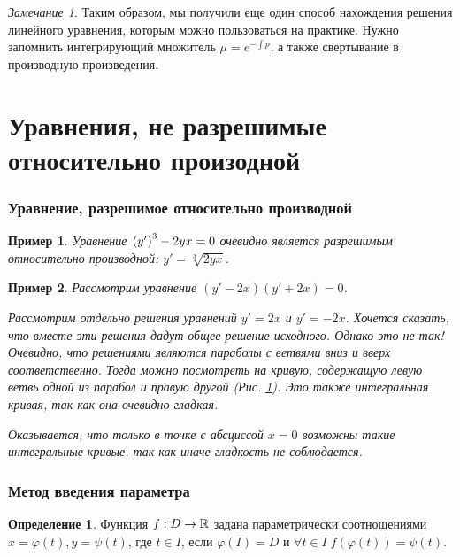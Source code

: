 \documentclass[a5paper, 10pt]{article}
\theoremstyle{definition}
\newtheorem{Def}{Определение}
\theoremstyle{plain}
\newtheorem{Ex}{Пример}
\theoremstyle{remark}
\newtheorem*{Note}{Замечание}
\begin{document}
	\begin{Note}
		Таким образом, мы получили еще один способ нахождения решения линейного уравнения, которым можно пользоваться на практике. Нужно запомнить интегрирующий множитель $\mu = e^{-\int\!p}$, а также свертывание в производную произведения.
	\end{Note}

	\part{Уравнения, не разрешимые относительно произодной}
	\section[Разрешимые уравнения]{Уравнение, разрешимое относительно производной}
	\begin{Ex}
		Уравнение $\left(y'\right)^3 -2yx = 0$ очевидно является разрешимым относительно производной:
		$y' = \sqrt[3]{2yx}$.
	\end{Ex}
	\begin{Ex}\label{ex_4}
		Рассмотрим уравнение $(y'-2x)(y'+2x) = 0$.
		
		Рассмотрим отдельно решения уравнений $y'=2x$ и $y' = -2x$. Хочется сказать, что вместе эти решения дадут общее решение исходного. Однако это не так! Очевидно, что решениями являются параболы с ветвями вниз и вверх соответственно. Тогда можно посмотреть на кривую, содержащую левую ветвь одной из парабол и правую другой (Рис. \ref{pic1}). Это также интегральная кривая, так как она очевидно гладкая.
		\begin{figure}[h!]
			\centering
		\caption{}\label{pic1}
		\end{figure}
		Оказывается, что только в точке с абсциссой $x=0$ возможны такие интегральные кривые, так как иначе гладкость не соблюдается.
	\end{Ex}

	\section{Метод введения параметра}
	\begin{Def}
		Функция $f: D \rightarrow \mathbb{R}$ задана параметрически соотношениями $x = \varphi(t), y = \psi(t)$, где $t\in I$, если $\varphi(I) = D$ и $\forall t\in I \; f(\varphi(t))=\psi(t)$.
	\end{Def}
\end{document}
